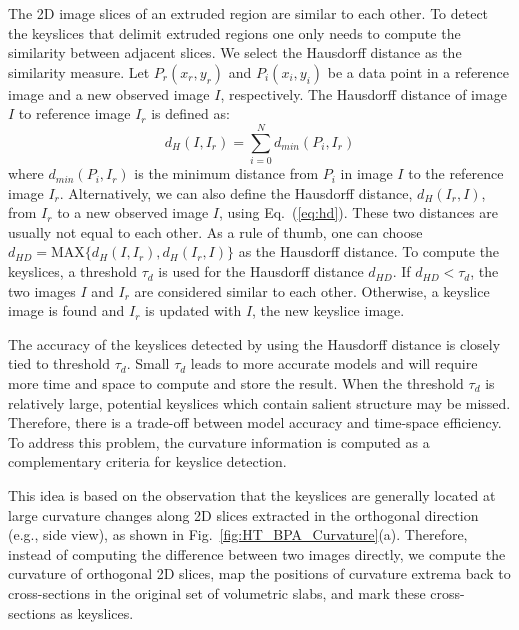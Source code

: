 \documentclass[10pt,journal,cspaper,compsoc]{IEEEtran}
\newcommand{\Eq}[1] {Eq.~(\ref{eq:#1})}
\newcommand{\Figa}[1]{Fig.~\ref{fig:#1}(a)}
\begin{document}
The 2D image slices of an extruded region are similar to each other.
To detect the keyslices that delimit extruded regions one only needs
to compute the similarity between adjacent slices.
We select the Hausdorff distance as the similarity measure.
Let $P_r(x_r, y_r)$ and $P_i(x_i, y_i)$ be a data point in 
a reference image and a new observed image $I$, respectively.
The Hausdorff distance of image $I$ to reference image $I_r$ is defined as:
\begin{equation}
d_H(I, I_r) = \sum_{i=0}^Nd_{min}(P_i, I_r)
\label{eq:hd}
\end{equation}
where $d_{min}(P_i, I_r)$ is the minimum distance from $P_i$ in image $I$
to the reference image $I_r$.
Alternatively, we can also define the Hausdorff distance, $d_H(I_r, I)$,
from $I_r$ to a new observed image $I$, using \Eq{hd}.
These two distances are usually not equal to each other.
As a rule of thumb, one can choose
$d_{HD} = \text{MAX}\{d_H(I, I_r), d_H(I_r, I)\}$ as the Hausdorff distance.
To compute the keyslices, a threshold $\tau_{d}$ is used for the
Hausdorff distance $d_{HD}$.
If $d_{HD} < \tau_{d}$, the two images $I$ and $I_r$ are considered
similar to each other.
Otherwise, a keyslice image is found and $I_r$ is updated with $I$,
the new keyslice image.

The accuracy of the keyslices detected by using the Hausdorff distance
is closely tied to threshold $\tau_d$.
Small $\tau_d$ leads to more accurate models and will require more time and
space to compute and store the result.
When the threshold $\tau_d$ is relatively large, potential keyslices which
contain salient structure may be missed.
Therefore, there is a trade-off between model accuracy and time-space
efficiency.
To address this problem, the curvature information is computed as a
complementary criteria for keyslice detection.

This idea is based on the observation that the keyslices are generally
located at large curvature changes along 2D slices extracted in the orthogonal
direction (e.g., side view), as shown in \Figa{HT_BPA_Curvature}.
Therefore, instead of computing the difference between two images directly,
we compute the curvature of orthogonal 2D slices, map the positions of
curvature extrema back to cross-sections in the original set of volumetric
slabs, and mark these cross-sections as keyslices.
\end{document}
